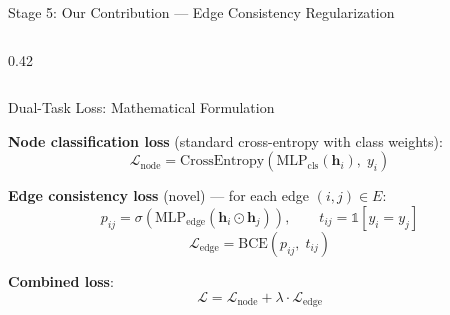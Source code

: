 \documentclass[aspectratio=169, 10pt]{beamer}
\newcommand{\Loss}{\mathcal{L}}
\newcommand{\vect}[1]{\bm{#1}}
\begin{document}
\begin{frame}{Stage 5: Our Contribution --- Edge Consistency Regularization}
\begin{columns}[T]
\begin{column}{0.42\textwidth}
\end{column}
\end{columns}
\end{frame}

\begin{frame}{Dual-Task Loss: Mathematical Formulation}

\textbf{Node classification loss} (standard cross-entropy with class weights):
\begin{equation*}
    \Loss_{\text{node}} = \text{CrossEntropy}\!\left(\text{MLP}_{\text{cls}}(\vect{h}_i),\; y_i\right)
\end{equation*}

\vspace{0.2cm}
\textbf{Edge consistency loss} (novel) --- for each edge $(i,j) \in E$:
\begin{equation*}
    p_{ij} = \sigma\!\left(\text{MLP}_{\text{edge}}(\vect{h}_i \odot \vect{h}_j)\right), \qquad
    t_{ij} = \mathbb{1}[y_i = y_j]
\end{equation*}
\begin{equation*}
    \Loss_{\text{edge}} = \text{BCE}(p_{ij},\; t_{ij})
\end{equation*}

\vspace{0.2cm}
\textbf{Combined loss}:
\begin{equation*}
    \boxed{\;\Loss = \Loss_{\text{node}} + \lambda \cdot \Loss_{\text{edge}}\;}
\end{equation*}


\end{frame}
\end{document}
